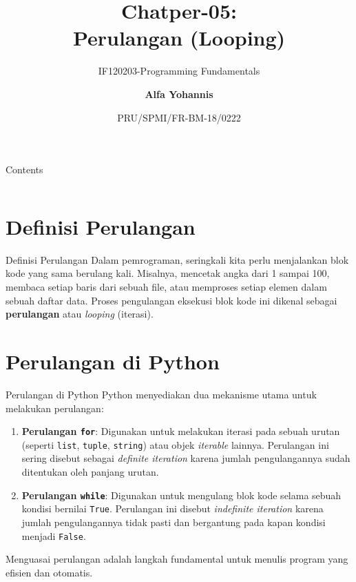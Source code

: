\documentclass[aspectratio=169, table]{beamer}
\subtitle{IF120203-Programming Fundamentals}
\title{Chatper-05:\\\LARGE{Perulangan (Looping)\\}
\vspace{10pt}}
\date[Serial]{\scriptsize {PRU/SPMI/FR-BM-18/0222}}
\author[Pradita]{\small{\textbf{Alfa Yohannis}}}
\begin{document}
\frame{\titlepage}

\begin{frame}[fragile]{Contents}
\vspace{15pt}
\begin{columns}[t]
\begin{column}{.5\textwidth}
\tableofcontents[sections={1-3}]
\end{column}
\begin{column}{.5\textwidth}
\tableofcontents[sections={4-5}]
\end{column}
\end{columns}
\end{frame}

\section{Definisi Perulangan}
\begin{frame}{Definisi Perulangan}
Dalam pemrograman, seringkali kita perlu menjalankan blok kode yang sama berulang kali. 
Misalnya, mencetak angka dari 1 sampai 100, membaca setiap baris dari sebuah file, atau 
memproses setiap elemen dalam sebuah daftar data. 
Proses pengulangan eksekusi blok kode ini dikenal sebagai \textbf{perulangan} atau \textit{looping} (iterasi).
\end{frame}

\section{Perulangan di Python}
\begin{frame}{Perulangan di Python}
Python menyediakan dua mekanisme utama untuk melakukan perulangan:
\begin{enumerate}
    \item \textbf{Perulangan \texttt{for}}: Digunakan untuk melakukan iterasi pada sebuah urutan (seperti \texttt{list}, \texttt{tuple}, \texttt{string}) atau objek \textit{iterable} lainnya. Perulangan ini sering disebut sebagai \textit{definite iteration} karena jumlah pengulangannya sudah ditentukan oleh panjang urutan.
    \item \textbf{Perulangan \texttt{while}}: Digunakan untuk mengulang blok kode selama sebuah kondisi bernilai \texttt{True}. Perulangan ini disebut \textit{indefinite iteration} karena jumlah pengulangannya tidak pasti dan bergantung pada kapan kondisi menjadi \texttt{False}.
\end{enumerate}

Menguasai perulangan adalah langkah fundamental untuk menulis program yang efisien dan otomatis.
\end{frame}
\end{document}
